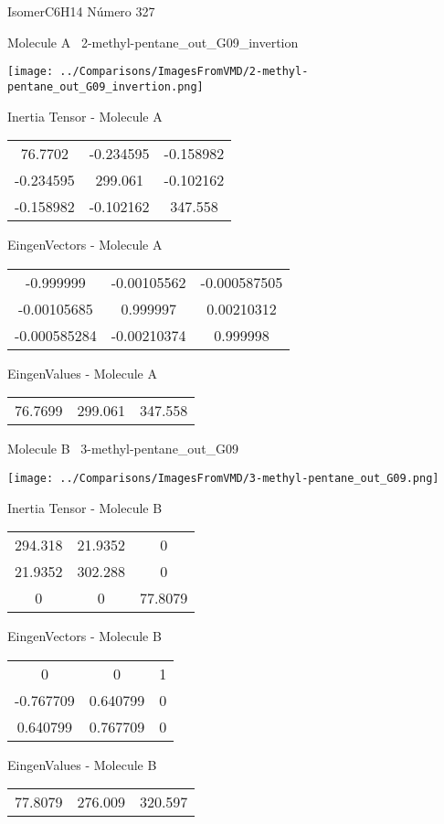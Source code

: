 \vtab[-3cm]
\begin{center}
{\large IsomerC6H14 \tab Número 327}
\end{center}
\begin{multicols}{2}
\begin{center}

Molecule A \
2-methyl-pentane\_out\_G09\_invertion

\texttt{[image: ../Comparisons/ImagesFromVMD/2-methyl-pentane\_out\_G09\_invertion.png]}

Inertia Tensor - Molecule A \\
\begin{tabular}{|c c c|}
76.7702	 & 	-0.234595	 & 	-0.158982	 \\
-0.234595	 & 	299.061	 & 	-0.102162	 \\
-0.158982	 & 	-0.102162	 & 	347.558
\end{tabular}

\vtab
 EingenVectors - Molecule A     \\
\begin{tabular}{|c c c|}
-0.999999	 & 	-0.00105562	 & 	-0.000587505	 \\
-0.00105685	 & 	0.999997	 & 	0.00210312	 \\
-0.000585284	 & 	-0.00210374	 & 	0.999998
\end{tabular}

\vtab
 EingenValues - Molecule A     \\
\begin{tabular}{|c c c|}
76.7699	 & 	299.061	 & 	347.558	 \\
\end{tabular}
\columnbreak

Molecule B \
3-methyl-pentane\_out\_G09

\texttt{[image: ../Comparisons/ImagesFromVMD/3-methyl-pentane\_out\_G09.png]}

Inertia Tensor - Molecule B \\
\begin{tabular}{|c c c|}
294.318	 & 	21.9352	 & 	0	 \\
21.9352	 & 	302.288	 & 	0	 \\
0	 & 	0	 & 	77.8079
\end{tabular}

\vtab
 EingenVectors - Molecule B     \\
\begin{tabular}{|c c c|}
0	 & 	0	 & 	1	 \\
-0.767709	 & 	0.640799	 & 	0	 \\
0.640799	 & 	0.767709	 & 	0
\end{tabular}

\vtab
 EingenValues - Molecule B     \\
\begin{tabular}{|c c c|}
77.8079	 & 	276.009	 & 	320.597	 \\
\end{tabular}

\end{center}
\end{multicols}

